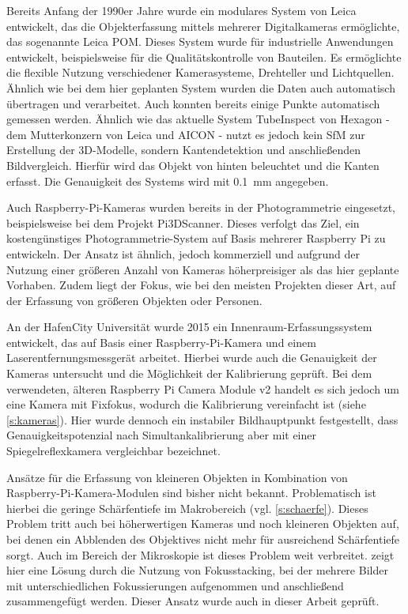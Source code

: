\documentclass[./00PhotoBox]{subfiles}
\begin{document}
Bereits Anfang der 1990er Jahre wurde ein modulares System von Leica entwickelt, das die Objekterfassung mittels mehrerer Digitalkameras ermöglichte, das sogenannte Leica POM. Dieses System wurde für industrielle Anwendungen entwickelt, beispielsweise für die Qualitätskontrolle von Bauteilen. Es ermöglichte die flexible Nutzung verschiedener Kamerasysteme, Drehteller und Lichtquellen. Ähnlich wie bei dem hier geplanten System wurden die Daten auch au\-to\-ma\-tisch übertragen und verarbeitet. Auch konnten bereits einige Punkte au\-to\-ma\-tisch gemessen werden. Ähnlich wie das aktuelle System TubeInspect \citep[vgl.][]{aicon_tubeinspect} von Hexagon - dem Mutterkonzern von Leica und AICON - nutzt es jedoch kein \Gls{SfM} zur Erstellung der 3D-Modelle, sondern Kantendetektion und anschließenden Bildvergleich. Hierfür wird das Objekt von hinten beleuchtet und die Kanten erfasst. Die Genauigkeit des Systems wird mit \SI{0,1}{\milli\metre} angegeben.
\citep[vgl.][]{leica_pom_concept}

Auch Raspberry-Pi-Kameras wurden bereits in der Photogrammetrie eingesetzt, beispielsweise bei dem Projekt Pi3DScanner. Dieses verfolgt das Ziel, ein kostengünstiges Photo\-grammetrie-System auf Basis mehrerer Raspberry Pi zu entwickeln. Der Ansatz ist ähnlich, jedoch kommerziell und aufgrund der Nutzung einer größeren Anzahl von Kameras höherpreisiger als das hier geplante Vorhaben. Zudem liegt der Fokus, wie bei den meisten Projekten dieser Art, auf der Erfassung von größeren Objekten oder Personen.
\citep[vgl.][]{pi3dscanner}

An der HafenCity Universität wurde 2015 ein Innenraum-Erfassungssystem entwickelt, das auf Basis einer Raspberry-Pi-Kamera und einem Laserentfernungsmessgerät arbeitet. Hierbei wurde auch die Genauigkeit der Kameras untersucht und die Möglichkeit der Kalibrierung geprüft. Bei dem verwendeten, älteren Raspberry Pi Camera Module v2 handelt es sich jedoch um eine Kamera mit Fixfokus, wodurch die Kalibrierung vereinfacht ist (siehe \autoref{s:kameras}). Hier wurde dennoch ein instabiler \Gls{Bildhauptpunkt} festgestellt, dass Genauigkeitspotenzial nach Simultankalibrierung aber mit einer Spiegelreflexkamera vergleichbar bezeichnet.
\citep[vgl.][]{3d_raspi_laserscanner}

Ansätze für die Erfassung von kleineren Objekten in Kombination von Raspberry-Pi-Kamera-Modulen sind bisher nicht bekannt. Problematisch ist hierbei die geringe Schärfentiefe im Makrobereich (vgl. \autoref{s:schaerfe}). Dieses Problem tritt auch bei höherwertigen Kameras und noch kleineren Objekten auf, bei denen ein Abblenden des Objektives nicht mehr für ausreichend Schärfentiefe sorgt. Auch im Bereich der Mikroskopie ist dieses Problem weit verbreitet. \citet{focusstack_sfm} zeigt hier eine Lösung durch die Nutzung von Fokusstacking, bei der mehrere Bilder mit unterschiedlichen Fokussierungen aufgenommen und anschließend zusammengefügt werden. Dieser Ansatz wurde auch in dieser Arbeit geprüft.
\end{document}

